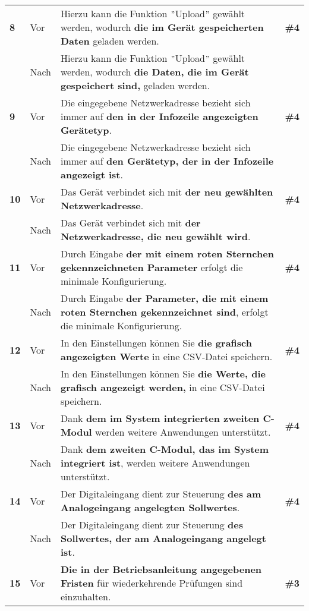 \begin{longtable}{llp{}l}
\tablevspace
{ \textbf{8}} & Vor & Hierzu kann die Funktion $"$Upload$"$ gewählt werden, wodurch \textbf{die im Gerät gespeicherten Daten} geladen werden. & \textbf{\#4}\\
& Nach & Hierzu kann die Funktion $"$Upload$"$ gewählt werden, wodurch \textbf{die Daten, die im Gerät gespeichert sind,} geladen werden. & \\
\tablevspace
{ \textbf{9}} & Vor & Die eingegebene Netzwerkadresse bezieht sich immer auf \textbf{den in der Infozeile angezeigten Gerätetyp}. & \textbf{\#4}\\
& Nach & Die eingegebene Netzwerkadresse bezieht sich immer auf \textbf{den Gerätetyp, der in der Infozeile angezeigt ist}. & \\
\tablevspace
{ \textbf{10}} & Vor & Das Gerät verbindet sich mit \textbf{der neu gewählten Netzwerkadresse}. & \textbf{\#4}\\
& Nach & Das Gerät verbindet sich mit \textbf{der Netzwerkadresse, die neu gewählt wird}. & \\
\tablevspace
{ \textbf{11}} & Vor & Durch Eingabe \textbf{der mit einem roten Sternchen gekennzeichneten Parameter} erfolgt die minimale Konfigurierung. & \textbf{\#4}\\
& Nach & Durch Eingabe \textbf{der Parameter, die mit einem roten Sternchen gekennzeichnet sind}, erfolgt die minimale Konfigurierung. & \\
\tablevspace
{ \textbf{12}} & Vor & In den Einstellungen können Sie \textbf{die grafisch angezeigten Werte} in eine CSV-Datei speichern. & \textbf{\#4}\\
& Nach & In den Einstellungen können Sie \textbf{die Werte, die grafisch angezeigt werden,} in eine CSV-Datei speichern. & \\
\tablevspace
{ \textbf{13}} & Vor & Dank \textbf{dem im System integrierten zweiten C-Modul} werden weitere Anwendungen unterstützt. & \textbf{\#4}\\
& Nach & Dank \textbf{dem zweiten C-Modul, das im System integriert ist}, werden weitere Anwendungen unterstützt. & \\
\tablevspace
{ \textbf{14}} & Vor & Der Digitaleingang dient zur Steuerung \textbf{des am Analogeingang angelegten Sollwertes}. & \textbf{\#4}\\
& Nach & Der Digitaleingang dient zur Steuerung \textbf{des Sollwertes, der am Analogeingang angelegt ist}. & \\
\tablevspace
{ \textbf{15}} & Vor & \textbf{Die in der Betriebsanleitung angegebenen Fristen} für wiederkehrende Prüfungen sind einzuhalten. & \textbf{\#3}\\

\end{longtable}
